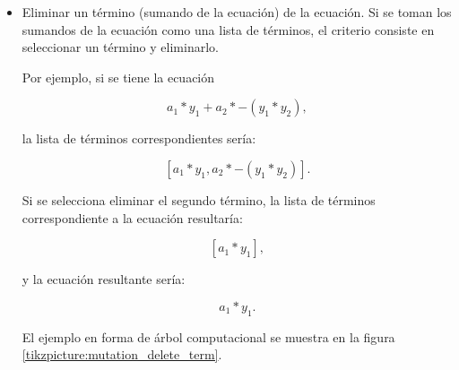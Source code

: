 \begin{itemize}
    \item Eliminar un término (sumando de la ecuación) de la ecuación. Si se toman los sumandos de la ecuación como una lista de términos, el criterio consiste en seleccionar un término y eliminarlo.

          Por ejemplo, si se tiene la ecuación

          $$a_1 * y_1 + a_2 * -(y_1 * y_2),$$

          la lista de términos correspondientes sería:

          $$[a_1*y_1, a_2 * -(y_1 * y_2)].$$

          Si se selecciona eliminar el segundo término, la lista de términos correspondiente a la ecuación resultaría:

          $$[a_1 * y_1],$$

          y la ecuación resultante sería:

          $$a_1 * y_1.$$

          El ejemplo en forma de árbol computacional se muestra en la figura \ref{tikzpicture:mutation_delete_term}.

          \begin{center}


\end{center}
\end{itemize}
